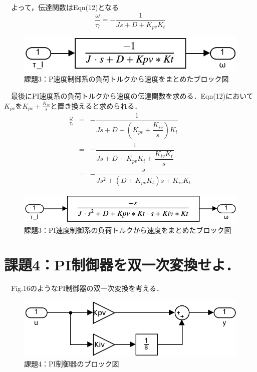 　よって，伝達関数はEqn(12)となる
\begin{equation}
    \frac{\omega}{\tau_l} = -\frac{1}{Js + D + K_{pv}K_t}
\end{equation}

\begin{figure}[H]
    \centering
    \includegraphics[]{./fig/3_P_tau_ans.pdf}
    \caption{課題3：P速度制御系の負荷トルクから速度をまとめたブロック図}
\end{figure}

　最後にPI速度系の負荷トルクから速度の伝達関数を求める．Eqn(12)において$K_{pv}$を$K_{pv}+\frac{K_{iv}}{s}$と置き換えると求められる．
\begin{eqnarray}
    \frac{\omega}{\tau_l} &=& -\dfrac{1}{Js + D + \left(K_{pv}+\dfrac{K_{iv}}{s}\right)K_t} \nonumber \\
                          &=& -\dfrac{1}{Js + D + K_{pv}K_t + \dfrac{K_{iv}K_t}{s}} \nonumber \\
                          &=& -\dfrac{s}{Js^2 + \left(D + K_{pv}K_t\right)s + K_{iv}K_t}
\end{eqnarray}

\begin{figure}[H]
    \centering
    \includegraphics[]{./fig/3_PI_tau_ans.pdf}
    \caption{課題3：PI速度制御系の負荷トルクから速度をまとめたブロック図}
\end{figure}

\section{課題4：PI制御器を双一次変換せよ．}
　Fig.16のようなPI制御器の双一次変換を考える．
\begin{figure}[H]
    \centering
    \includegraphics[]{./fig/4.pdf}
    \caption{課題4：PI制御器のブロック図}
\end{figure}


